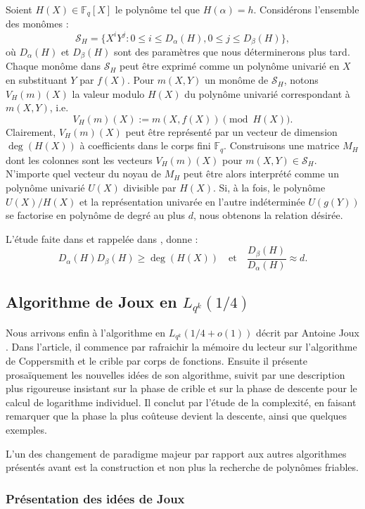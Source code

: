 \documentclass[a4paper, titlepage, 11pt]{article}
\theoremstyle{definition}
\theoremstyle{remark}
\def\o{o}
\def\gf #1{\mathbb{F}_{#1}}
\begin{document}
Soient $H(X)\in\gf{q}[X]$ le polynôme tel que $H(\alpha) = h$. Considérons l'ensemble des monômes :
$$\mathcal S_H = \{X^iY^j : 0 \leqslant i \leqslant D_\alpha(H), 0 \leqslant j \leqslant D_\beta(H)\},$$
où $D_\alpha(H)$ et $D_\beta(H)$ sont des paramètres que nous déterminerons plus tard. Chaque monôme dans $\mathcal S_H$ peut être exprimé comme un polynôme univarié en $X$ en substituant $Y$ par $f(X)$. Pour $m(X,Y)$ un monôme de $\mathcal S_H$, notons $V_H(m)(X)$ la valeur modulo $H(X)$ du polynôme univarié correspondant à $m(X,Y)$, i.e. 
$$V_H(m)(X) := m(X,f(X)) \pmod{H(X)}.$$
Clairement, $V_H(m)(X)$ peut être représenté par un vecteur de dimension $\deg(H(X))$ à coefficients dans le corps fini $\gf{q}$. Construisons une matrice $M_H$ dont les colonnes sont les vecteurs $V_H(m)(X)$ pour $m(X,Y) \in \mathcal S_H$. N'importe quel vecteur du noyau de $M_H$ peut être alors interprété comme un polynôme univarié $U(X)$ divisible par $H(X)$. Si, à la fois, le polynôme $U(X)/H(X)$ et la représentation univarée en l'autre indéterminée $U(g(Y))$ se factorise en polynôme de degré au plus $d$, nous obtenons la relation désirée.

L'étude faite dans \cite{joux2006, joux2002} et rappelée dans \cite{joux2013}, donne :
$$D_\alpha(H) D_\beta(H) \geqslant \deg(H(X)) \quad\text{et}\quad \frac{D_\beta(H)}{D_\alpha(H)} \approx d.$$

\subsection{Algorithme de Joux en $L_{q^k}(1/4)$}

Nous arrivons enfin à l'algorithme en $L_{q^k}(1/4 + \o(1))$ décrit par Antoine Joux \cite{joux2013}. Dans l'article, il commence par rafraichir la mémoire du lecteur sur l'algorithme de Coppersmith et le crible par corps de fonctions. Ensuite il présente prosaïquement les nouvelles idées de son algorithme, suivit par une description plus rigoureuse insistant sur la phase de crible et sur la phase de descente pour le calcul de logarithme individuel. Il conclut par l'étude de la complexité, en faisant remarquer que la phase la plus coûteuse devient la descente, ainsi que quelques exemples.

L'un des changement de paradigme majeur par rapport aux autres algorithmes présentés avant est la construction et non plus la recherche de polynômes friables.

\subsubsection{Présentation des idées de Joux}
\end{document}
